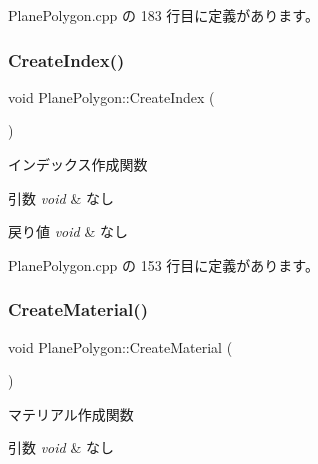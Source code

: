 Plane\+Polygon.\+cpp の 183 行目に定義があります。

\mbox{\label{class_plane_polygon_a55840ace8bfa216c37f94e963b3fa5e3}} 
\subsubsection{\texorpdfstring{Create\+Index()}{CreateIndex()}}
{\footnotesize\ttfamily void Plane\+Polygon\+::\+Create\+Index (\begin{DoxyParamCaption}{ }\end{DoxyParamCaption})\hspace{0.3cm}{\ttfamily [private]}}



インデックス作成関数 


\begin{DoxyParams}{引数}
{\em void} & なし \\
\hline
\end{DoxyParams}

\begin{DoxyRetVals}{戻り値}
{\em void} & なし \\
\hline
\end{DoxyRetVals}


 Plane\+Polygon.\+cpp の 153 行目に定義があります。

\mbox{\label{class_plane_polygon_a4539899c78a222ddc651e45943a7f55b}} 
\subsubsection{\texorpdfstring{Create\+Material()}{CreateMaterial()}}
{\footnotesize\ttfamily void Plane\+Polygon\+::\+Create\+Material (\begin{DoxyParamCaption}{ }\end{DoxyParamCaption})\hspace{0.3cm}{\ttfamily [private]}}



マテリアル作成関数 


\begin{DoxyParams}{引数}
{\em void} & なし \\
\hline
\end{DoxyParams}


